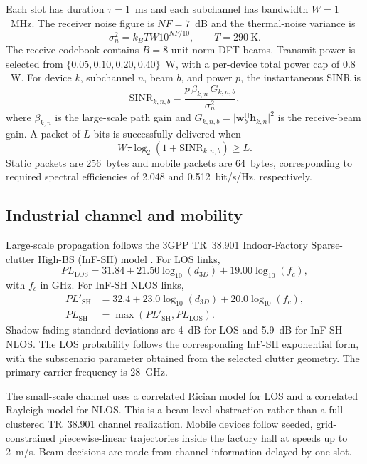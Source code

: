\documentclass[number]{autarticle}
\newcommand{\SINR}{\mathrm{SINR}}
\begin{document}
Each slot has duration $\tau=1$~ms and each subchannel has bandwidth $W=1$~MHz. The receiver noise figure is $NF=7$~dB and the thermal-noise variance is
\begin{equation}
\sigma_n^2=k_B T W 10^{NF/10}, \qquad T=290~\mathrm{K}.
\end{equation}
The receive codebook contains $B=8$ unit-norm DFT beams. Transmit power is selected from $\{0.05,0.10,0.20,0.40\}$~W, with a per-device total power cap of $0.8$~W. For device $k$, subchannel $n$, beam $b$, and power $p$, the instantaneous SINR is
\begin{equation}
\SINR_{k,n,b}=\frac{p\,\beta_{k,n}\,G_{k,n,b}}{\sigma_n^2},
\end{equation}
where $\beta_{k,n}$ is the large-scale path gain and $G_{k,n,b}=\lvert\mathbf{w}_b^{\mathsf H}\mathbf{h}_{k,n}\rvert^2$ is the receive-beam gain. A packet of $L$ bits is successfully delivered when
\begin{equation}
W\tau\log_2\!\left(1+\SINR_{k,n,b}\right)\ge L.
\end{equation}
Static packets are 256~bytes and mobile packets are 64~bytes, corresponding to required spectral efficiencies of 2.048 and 0.512~bit/s/Hz, respectively.

\subsection{Industrial channel and mobility}
Large-scale propagation follows the 3GPP TR~38.901 Indoor-Factory Sparse-clutter High-BS (InF-SH) model \cite{tr38901}. For LOS links,
\begin{equation}
PL_{\mathrm{LOS}}=31.84+21.50\log_{10}(d_{3D})+19.00\log_{10}(f_c),
\end{equation}
with $f_c$ in GHz. For InF-SH NLOS links,
\begin{align}
PL'_{\mathrm{SH}} &= 32.4+23.0\log_{10}(d_{3D})+20.0\log_{10}(f_c),\\
PL_{\mathrm{SH}} &= \max\left(PL'_{\mathrm{SH}},PL_{\mathrm{LOS}}\right).
\end{align}
Shadow-fading standard deviations are 4~dB for LOS and 5.9~dB for InF-SH NLOS. The LOS probability follows the corresponding InF-SH exponential form, with the subscenario parameter obtained from the selected clutter geometry. The primary carrier frequency is 28~GHz.

The small-scale channel uses a correlated Rician model for LOS and a correlated Rayleigh model for NLOS. This is a beam-level abstraction rather than a full clustered TR~38.901 channel realization. Mobile devices follow seeded, grid-constrained piecewise-linear trajectories inside the factory hall at speeds up to 2~m/s. Beam decisions are made from channel information delayed by one slot.
\end{document}

